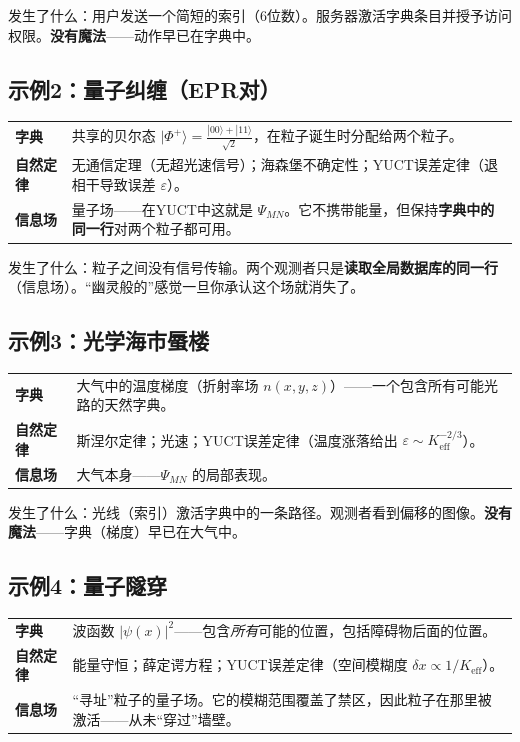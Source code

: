 \documentclass[12pt,a4paper]{article}
\begin{document}
	\noindent 发生了什么：用户发送一个简短的索引（6位数）。服务器激活字典条目并授予访问权限。\textbf{没有魔法}——动作早已在字典中。
	
	\subsection{示例2：量子纠缠（EPR对）}
	
	\begin{tabular}{p{2.8cm} p{10cm}}
		\textbf{字典} & 共享的贝尔态 \(|\Phi^+\rangle = \frac{|00\rangle + |11\rangle}{\sqrt{2}}\)，在粒子诞生时分配给两个粒子。 \\
		\textbf{自然定律} & 无通信定理（无超光速信号）；海森堡不确定性；YUCT误差定律（退相干导致误差 \(\varepsilon\)）。 \\
		\textbf{信息场} & 量子场——在YUCT中这就是 \(\Psi_{MN}\)。它不携带能量，但保持\textbf{字典中的同一行}对两个粒子都可用。 \\
	\end{tabular}
	
	\noindent 发生了什么：粒子之间没有信号传输。两个观测者只是\textbf{读取全局数据库的同一行}（信息场）。“幽灵般的”感觉一旦你承认这个场就消失了。
	
	\subsection{示例3：光学海市蜃楼}
	
	\begin{tabular}{p{2.8cm} p{10cm}}
		\textbf{字典} & 大气中的温度梯度（折射率场 \(n(x,y,z)\)）——一个包含所有可能光路的天然字典。 \\
		\textbf{自然定律} & 斯涅尔定律；光速；YUCT误差定律（温度涨落给出 \(\varepsilon \sim K_{\mathrm{eff}}^{-2/3}\)）。 \\
		\textbf{信息场} & 大气本身——\(\Psi_{MN}\) 的局部表现。 \\
	\end{tabular}
	
	\noindent 发生了什么：光线（索引）激活字典中的一条路径。观测者看到偏移的图像。\textbf{没有魔法}——字典（梯度）早已在大气中。
	
	\subsection{示例4：量子隧穿}
	
	\begin{tabular}{p{2.8cm} p{10cm}}
		\textbf{字典} & 波函数 \(|\psi(x)|^2\)——包含\emph{所有}可能的位置，包括障碍物后面的位置。 \\
		\textbf{自然定律} & 能量守恒；薛定谔方程；YUCT误差定律（空间模糊度 \(\delta x \propto 1/K_{\mathrm{eff}}\)）。 \\
		\textbf{信息场} & “寻址”粒子的量子场。它的模糊范围覆盖了禁区，因此粒子在那里被激活——从未“穿过”墙壁。 \\
	\end{tabular}
	
\end{document}
